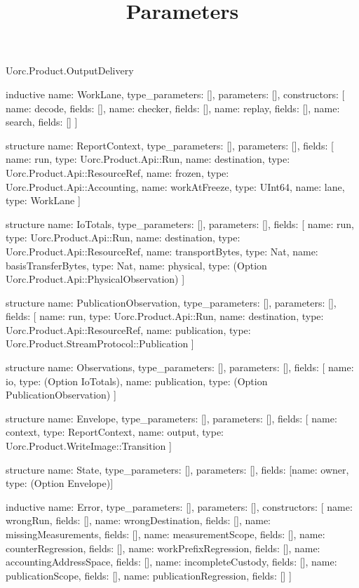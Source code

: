 \begin{lexlean}{Uorc.Product.OutputDelivery}
\title{Parameters}
\begin{semanticmodule}
inductive{
  name: WorkLane,
  type_parameters: [],
  parameters: [],
  constructors: [
    {name: decode, fields: []},
    {name: checker, fields: []},
    {name: replay, fields: []},
    {name: search, fields: []}
  ]
}

structure{
  name: ReportContext,
  type_parameters: [],
  parameters: [],
  fields: [
    {name: run, type: Uorc.Product.Api::Run},
    {name: destination, type: Uorc.Product.Api::ResourceRef},
    {name: frozen, type: Uorc.Product.Api::Accounting},
    {name: workAtFreeze, type: UInt64},
    {name: lane, type: WorkLane}
  ]
}

structure{
  name: IoTotals,
  type_parameters: [],
  parameters: [],
  fields: [
    {name: run, type: Uorc.Product.Api::Run},
    {name: destination, type: Uorc.Product.Api::ResourceRef},
    {name: transportBytes, type: Nat},
    {name: basisTransferBytes, type: Nat},
    {name: physical, type: (Option Uorc.Product.Api::PhysicalObservation)}
  ]
}

structure{
  name: PublicationObservation,
  type_parameters: [],
  parameters: [],
  fields: [
    {name: run, type: Uorc.Product.Api::Run},
    {name: destination, type: Uorc.Product.Api::ResourceRef},
    {name: publication, type: Uorc.Product.StreamProtocol::Publication}
  ]
}

structure{
  name: Observations,
  type_parameters: [],
  parameters: [],
  fields: [
    {name: io, type: (Option IoTotals)},
    {name: publication, type: (Option PublicationObservation)}
  ]
}

structure{
  name: Envelope,
  type_parameters: [],
  parameters: [],
  fields: [
    {name: context, type: ReportContext},
    {name: output, type: Uorc.Product.WriteImage::Transition}
  ]
}

structure{
  name: State,
  type_parameters: [],
  parameters: [],
  fields: [{name: owner, type: (Option Envelope)}]
}

inductive{
  name: Error,
  type_parameters: [],
  parameters: [],
  constructors: [
    {name: wrongRun, fields: []},
    {name: wrongDestination, fields: []},
    {name: missingMeasurements, fields: []},
    {name: measurementScope, fields: []},
    {name: counterRegression, fields: []},
    {name: workPrefixRegression, fields: []},
    {name: accountingAddressSpace, fields: []},
    {name: incompleteCustody, fields: []},
    {name: publicationScope, fields: []},
    {name: publicationRegression, fields: []}
  ]
}


\end{semanticmodule}
\end{lexlean}
